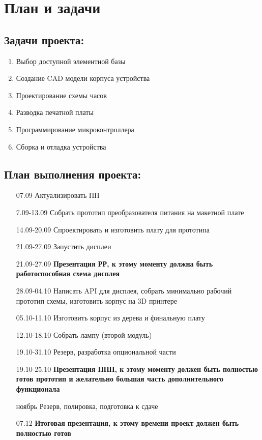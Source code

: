 \documentclass[a4paper,14pt]{extarticle}
\begin{document}
\section{План и задачи}

\subsection{Задачи проекта:}
\begin{enumerate}
	\item Выбор доступной элементной базы
	\item Создание CAD модели корпуса устройства
	\item Проектирование схемы часов
	\item Разводка печатной платы
	\item Программирование микроконтроллера
	\item Сборка и отладка устройства
\end{enumerate}

\subsection{План выполнения проекта:}
\begin{enumerate}
	\item [07.09] Актуализировать ПП
	\item [7.09-13.09] Собрать прототип преобразователя питания на макетной плате
	\item [14.09-20.09] Спроектировать и изготовить плату для прототипа
	\item [21.09-27.09] Запустить дисплеи
	\item [21.09-27.09] \textbf{Презентация РР, к этому моменту должна быть работоспособная схема дисплея}
	\item [28.09-04.10] Написать API для дисплея,
		собрать минимально рабочий прототип схемы,
		изготовить корпус на 3D принтере
	\item [05.10-11.10] Изготовить корпус из дерева и
		финальную плату
	\item [12.10-18.10] Собрать лампу (второй модуль)
	\item [19.10-31.10] Резерв, разработка опциональной части
	\item [19.10-25.10] \textbf{Презентация ППП, к этому моменту должен быть полностью готов прототип и желательно
		большая часть дополнительного функционала}
	\item [ноябрь] Резерв, полировка, подготовка к сдаче
	\item [07.12] \textbf{Итоговая презентация, к этому времени проект должен быть полностью готов}
\end{enumerate}
\end{document}
